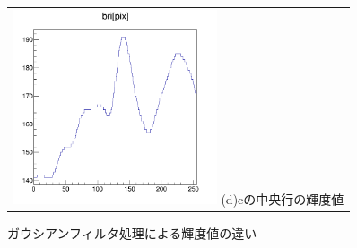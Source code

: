 \documentclass[12pt,a4paper]{jarticle}
\begin{document}
\begin{figure}[htbp]
\begin{tabular}{c}
        \begin{minipage}{0.5\hsize}
          \centering
              \includegraphics[clip, width=60mm]{gau2_hist.png}
              \hspace{1.6cm} (d)cの中央行の輝度値
        \end{minipage}
    
      \end{tabular}
      \caption{ガウシアンフィルタ処理による輝度値の違い\label{fig:do_gau_beforeandafter}}
\end{figure}
\end{document}
